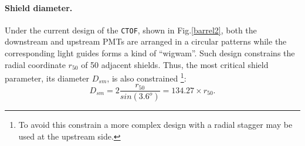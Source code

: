 \documentclass[12pt]{article}
\begin{document}
\paragraph{Shield diameter.}
Under the current design of the {\tt CTOF}, shown in Fig.\ref{barrel2},
both the downstream and upstream PMTs are arranged in a 
circular patterns while  the corresponding light guides forms a  kind of ``wigwam''. 
Such design constrains the radial coordinate $r_{50}$  of 50 adjacent  shields. 
Thus, the most critical shield  parameter, its diameter $D_{sm}$,  
is also constrained
\footnote{To avoid this constrain a more complex design with a  radial 
stagger may be used at the upstream side.}:
%
\begin{equation}
D_{sm}=2\frac{r_{50}}{sin(3.6^o)} =134.27\times r_{50}.
\label{eq776}
\end{equation}
%
\end{document}
